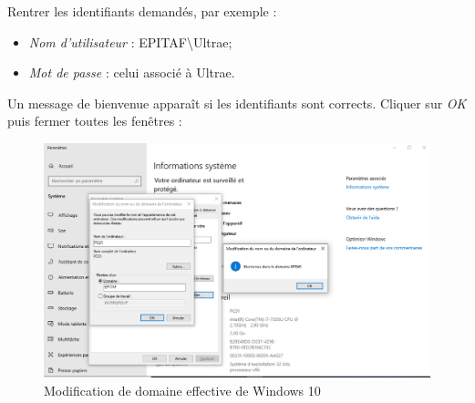 \newpage
Rentrer les identifiants demandés, par exemple :
\begin{itemize}
    \item \textit{Nom d'utilisateur} : EPITAF\textbackslash Ultrae;
    \item \textit{Mot de passe} : celui associé à Ultrae.
\end{itemize}
Un message de bienvenue apparaît si les identifiants sont corrects. Cliquer sur \textit{OK} puis fermer toutes les fenêtres :
\begin{figure}[h!]
	\begin{center}
		\includegraphics[scale=0.5]{W_Screenshots/51.png}
		\caption{Modification de domaine effective de Windows 10}
		\label{W_Screenshots/51}
	\end{center}
\end{figure}
\FloatBarrier